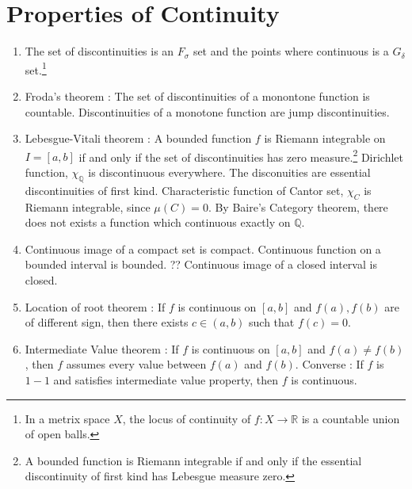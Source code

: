 \section{Properties of Continuity}
\begin{enumerate}
	\item The set of discontinuities is an $F_\sigma$ set and the points where continuous is a $G_\delta$ set.\footnote{In a metrix space $X$, the locus of continuity of $f : X \to \mathbb{R}$ is a countable union of open balls.}
	\item Froda's theorem : The set of discontinuities of a monontone function is countable.
	\subitem Discontinuities of a monotone function are jump discontinuities.
	\item Lebesgue-Vitali theorem : A bounded function $f$ is Riemann integrable on $I=[a,b]$ if and only if the set of discontinuities has zero measure.\footnote{A bounded function is Riemann integrable if and only if the essential discontinuity of first kind has Lebesgue measure zero.}
	\subitem Dirichlet function, $\chi_\mathbb{Q}$ is discontinuous everywhere. The disconuities are essential discontinuities of first kind.
	\subitem Characteristic function of Cantor set, $\chi_C$ is Riemann integrable, since $\mu(C)=0$.
	\subitem By Baire's Category theorem, there does not exists a function which continuous exactly on $\mathbb{Q}$.
	\item Continuous image of a compact set is compact.
	\subitem Continuous function on a bounded interval is bounded. ??
	\subitem Continuous image of a closed interval is closed.
	\item Location of root theorem : If $f$ is continuous on $[a,b]$ and $f(a),f(b)$ are of different sign, then there exists $c \in (a,b)$ such that $f(c) = 0$.
	\item Intermediate Value theorem : If $f$ is continuous on $[a,b]$ and $f(a) \ne f(b)$, then $f$ assumes every value between $f(a)$ and $f(b)$.
	\subitem Converse : If $f$ is $1-1$ and satisfies intermediate value property, then $f$ is continuous.
\end{enumerate}

